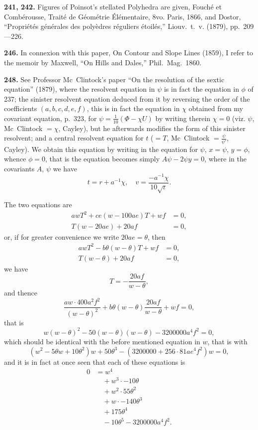 \documentclass[11pt,a4paper]{book}
\begin{document}
\vspace{0.5em}

\noindent\textbf{241, 242.} Figures of Poinsot's stellated Polyhedra are given, Fouch\'{e} et Comb\'{e}rousse, Trait\'{e} de G\'{e}om\'{e}trie \'{E}l\'{e}mentaire, 8vo. Paris, 1866, and Dostor, ``Propri\'{e}t\'{e}s g\'{e}n\'{e}rales des poly\`{e}dres r\'{e}guliers \'{e}toil\'{e}s,'' Liouv.~t.~v. (1879), pp.~209---226.

\vspace{0.5em}

\noindent\textbf{246.} In connexion with this paper, On Contour and Slope Lines (1859), I refer to the memoir by Maxwell, ``On Hills and Dales,'' Phil.~Mag.~1860.

\vspace{0.5em}

\noindent\textbf{248.} See Professor Mc~Clintock's paper ``On the resolution of the sextic equation'' (1879), where the resolvent equation in $\psi$ is in fact the equation in $\phi$ of 237; the sinister resolvent equation deduced from it by reversing the order of the coefficients $(a, b, c, d, e, f)$, this is in fact the equation in $\chi$ obtained from my covariant equation, p.~323, for $\psi = \frac{1}{10}(\Phi - \chi U)$ by writing therein $\chi = 0$ (viz. $\psi$, Mc~Clintock $= \chi$, Cayley), but he afterwards modifies the form of this sinister resolvent; and a central resolvent equation for $t$ ($= T$, Mc~Clintock $= \frac{\psi}{\psi'}$, Cayley). We obtain this equation by writing in the equation for $\psi$, $x = \psi$, $y = \phi$, whence $\phi = 0$, that is the equation becomes simply $A\psi - 2\psi y = 0$, where in the covariants $A$, $\psi$ we have
\[
t = r + a^{-1}\chi,\quad v = \frac{-a^{-1}\chi}{10\sqrt{\iota}}.
\]

The two equations are
\begin{align*}
awT^2 + ce(w - 100 ae) T + wf &=  0,\\
T(w - 20 ae) + 20 af &= 0,
\end{align*}
or, if for greater convenience we write $20 ae = \theta$, then
\begin{align*}
awT^2 - b\theta(w - \theta)T + wf &= 0,\\
T(w - \theta) + 20af &= 0,
\end{align*}
we have
\[
T = -\frac{20af}{w - \theta},
\]
and thence
\[
\frac{aw \cdot 400 a^2f^2}{(w - \theta)^2} + b\theta(w - \theta)\frac{20af}{w - \theta} + wf = 0,
\]
that is
\[
w(w - \theta)^2 - 50(w - \theta)(w - \theta) - 3200000 a^4f^2 = 0,
\]
which should be identical with the before mentioned equation in $w$, that is with
\[
(w^2 - 5\theta w + 10\theta^2)w + 50\theta^3 - (3200000 + 256\cdot 81 ae^4f^2)w = 0,
\]
and it is in fact at once seen that each of these equations is
\begin{align*}
0 &= w^4 \\
&\quad + w^3 \cdot -10\theta \\
&\quad + w^2 \cdot 55\theta^2 \\
&\quad + w \cdot -140\theta^3 \\
&\quad + 175\theta^4 \\
&\quad - 10\theta^5 - 3200000a^4f^2.
\end{align*}
\end{document}

